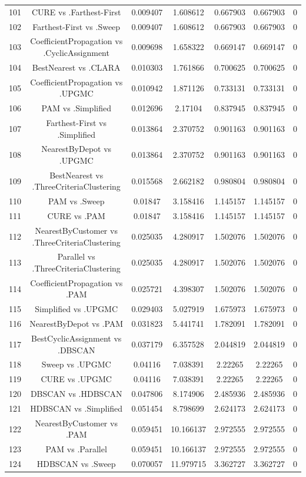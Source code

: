 \documentclass[a4paper,10pt]{article}
\begin{document}
\begin{landscape}
\begin{table}[!htp]
\begin{tabular}{ccccccc}
101&CURE vs .Farthest-First&0.009407&1.608612&0.667903&0.667903&0\\
102&Farthest-First vs .Sweep&0.009407&1.608612&0.667903&0.667903&0\\
103&CoefficientPropagation vs .CyclicAssignment&0.009698&1.658322&0.669147&0.669147&0\\
104&BestNearest vs .CLARA&0.010303&1.761866&0.700625&0.700625&0\\
105&CoefficientPropagation vs .UPGMC&0.010942&1.871126&0.733131&0.733131&0\\
106&PAM vs .Simplified&0.012696&2.17104&0.837945&0.837945&0\\
107&Farthest-First vs .Simplified&0.013864&2.370752&0.901163&0.901163&0\\
108&NearestByDepot vs .UPGMC&0.013864&2.370752&0.901163&0.901163&0\\
109&BestNearest vs .ThreeCriteriaClustering&0.015568&2.662182&0.980804&0.980804&0\\
110&PAM vs .Sweep&0.01847&3.158416&1.145157&1.145157&0\\
111&CURE vs .PAM&0.01847&3.158416&1.145157&1.145157&0\\
112&NearestByCustomer vs .ThreeCriteriaClustering&0.025035&4.280917&1.502076&1.502076&0\\
113&Parallel vs .ThreeCriteriaClustering&0.025035&4.280917&1.502076&1.502076&0\\
114&CoefficientPropagation vs .PAM&0.025721&4.398307&1.502076&1.502076&0\\
115&Simplified vs .UPGMC&0.029403&5.027919&1.675973&1.675973&0\\
116&NearestByDepot vs .PAM&0.031823&5.441741&1.782091&1.782091&0\\
117&BestCyclicAssignment vs .DBSCAN&0.037179&6.357528&2.044819&2.044819&0\\
118&Sweep vs .UPGMC&0.04116&7.038391&2.22265&2.22265&0\\
119&CURE vs .UPGMC&0.04116&7.038391&2.22265&2.22265&0\\
120&DBSCAN vs .HDBSCAN&0.047806&8.174906&2.485936&2.485936&0\\
121&HDBSCAN vs .Simplified&0.051454&8.798699&2.624173&2.624173&0\\
122&NearestByCustomer vs .PAM&0.059451&10.166137&2.972555&2.972555&0\\
123&PAM vs .Parallel&0.059451&10.166137&2.972555&2.972555&0\\
124&HDBSCAN vs .Sweep&0.070057&11.979715&3.362727&3.362727&0\\

\end{tabular}
\end{table}
\end{landscape}
\end{document}

